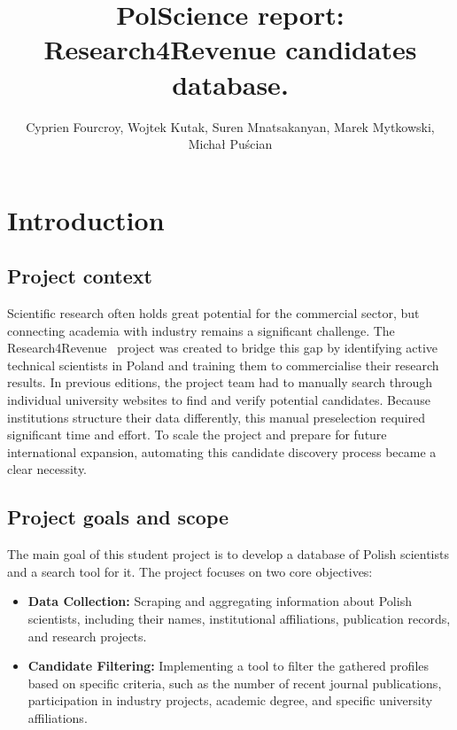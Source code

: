 \documentclass{article}
\title{PolScience report: Research4Revenue candidates database.}
\author{Cyprien Fourcroy, Wojtek Kutak, Suren Mnatsakanyan,  Marek Mytkowski, Michał Puścian}
\begin{document}
\maketitle

\section{Introduction}

\subsection{Project context}
Scientific research often holds great potential for the commercial sector, but connecting academia with industry remains a significant challenge. The Research4Revenue~\cite{re4re-website} project was created to bridge this gap by identifying active technical scientists in Poland and training them to commercialise their research results. In previous editions, the project team had to manually search through individual university websites to find and verify potential candidates. Because institutions structure their data differently, this manual preselection required significant time and effort. To scale the project and prepare for future international expansion, automating this candidate discovery process became a clear necessity.

\subsection{Project goals and scope}
\label{sec:introduction-goals}
The main goal of this student project is to develop a database of Polish scientists and a search tool for it. The project focuses on two core objectives:
\begin{itemize}
    \item \textbf{Data Collection:} Scraping and aggregating information about Polish scientists, including their names, institutional affiliations, publication records, and research projects.
    \item \textbf{Candidate Filtering:} Implementing a tool to filter the gathered profiles based on specific criteria, such as the number of recent journal publications, participation in industry projects, academic degree, and specific university affiliations.
\end{itemize}
\end{document}
